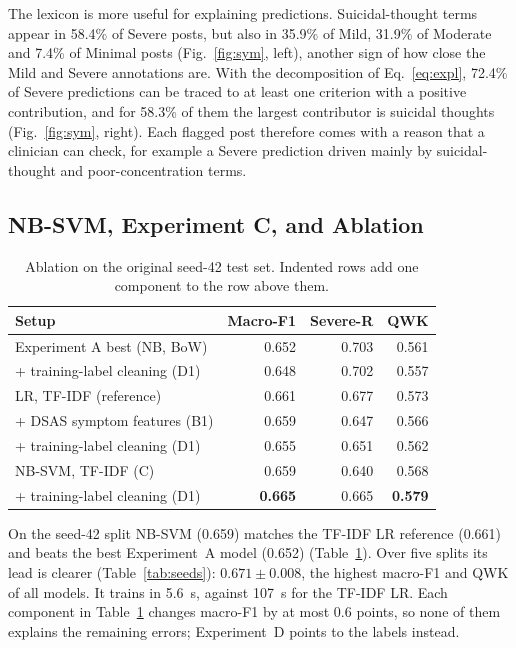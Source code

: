 \documentclass[conference]{IEEEtran}
\begin{document}
The lexicon is more useful for explaining predictions. Suicidal-thought terms appear in 58.4\% of Severe posts, but also in 35.9\% of Mild, 31.9\% of Moderate and 7.4\% of Minimal posts (Fig.~\ref{fig:sym}, left), another sign of how close the Mild and Severe annotations are. With the decomposition of Eq.~\eqref{eq:expl}, 72.4\% of Severe predictions can be traced to at least one criterion with a positive contribution, and for 58.3\% of them the largest contributor is suicidal thoughts (Fig.~\ref{fig:sym}, right). Each flagged post therefore comes with a reason that a clinician can check, for example a Severe prediction driven mainly by suicidal-thought and poor-concentration terms.

\subsection{NB-SVM, Experiment C, and Ablation}

\begin{table}[!htbp]
\centering
\caption{Ablation on the original seed-42 test set. Indented rows add one component to the row above them.}
\label{tab:abl}
\begin{tabular}{lrrr}
\toprule
Setup & Macro-F1 & Severe-R & QWK \\
\midrule
Experiment A best (NB, BoW) & 0.652 & 0.703 & 0.561 \\
\quad + training-label cleaning (D1) & 0.648 & 0.702 & 0.557 \\
LR, TF-IDF (reference) & 0.661 & 0.677 & 0.573 \\
\quad + DSAS symptom features (B1) & 0.659 & 0.647 & 0.566 \\
\quad + training-label cleaning (D1) & 0.655 & 0.651 & 0.562 \\
NB-SVM, TF-IDF (C) & 0.659 & 0.640 & 0.568 \\
\quad + training-label cleaning (D1) & \textbf{0.665} & 0.665 & \textbf{0.579} \\
\bottomrule
\end{tabular}
\end{table}

On the seed-42 split NB-SVM (0.659) matches the TF-IDF LR reference (0.661) and beats the best Experiment~A model (0.652) (Table~\ref{tab:abl}). Over five splits its lead is clearer (Table~\ref{tab:seeds}): $0.671\pm0.008$, the highest macro-F1 and QWK of all models. It trains in 5.6~s, against 107~s for the TF-IDF LR. Each component in Table~\ref{tab:abl} changes macro-F1 by at most 0.6 points, so none of them explains the remaining errors; Experiment~D points to the labels instead.
\end{document}
